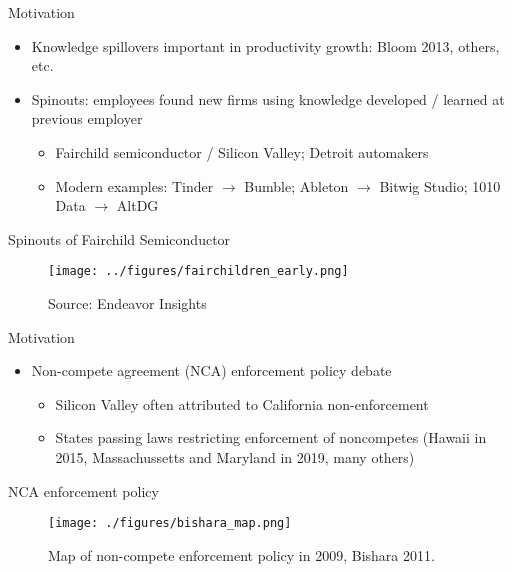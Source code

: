 \documentclass[english,usenames,dvipsnames]{beamer}
\begin{document}
\begin{frame}{Motivation}\label{motivation_spillovers}
\begin{itemize}
\item Knowledge spillovers important in productivity growth: Bloom 2013, others, etc.
\item Spinouts: employees found new firms using knowledge developed / learned at previous employer  \hyperlink{spinouts_facts_from_literature}{}
\begin{itemize}
	\item Fairchild semiconductor / Silicon Valley; Detroit automakers
	\item Modern examples: Tinder $\rightarrow$ Bumble; Ableton $\rightarrow$ Bitwig Studio; 1010 Data $\rightarrow$ AltDG 
\end{itemize}
\end{itemize}
\end{frame}

\begin{frame}{Spinouts of Fairchild Semiconductor}
\begin{figure}
\texttt{[image: ../figures/fairchildren\_early.png]}
\caption{Source: Endeavor Insights}
\end{figure}
\end{frame}

\begin{frame}{Motivation}
\begin{itemize}
\item Non-compete agreement (NCA) enforcement policy debate
\begin{itemize}
\item Silicon Valley often attributed to California non-enforcement
\item States passing laws restricting enforcement of noncompetes (Hawaii in 2015, Massachussetts and Maryland in 2019, many others)
\end{itemize}
\end{itemize}
\end{frame}


\begin{frame}{NCA enforcement policy}
\begin{figure}
\texttt{[image: ./figures/bishara\_map.png]}
\caption{Map of non-compete enforcement policy in 2009, Bishara 2011.}
\end{figure}
\end{frame}
\end{document}
